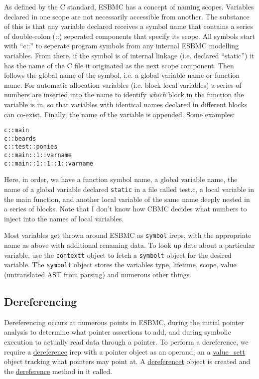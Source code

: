 \documentclass{article}
\begin{document}
As defined by the C standard, ESBMC has a concept of naming scopes. Variables
declared in one scope are not necessarily accessible from another. The substance
of this is that any variable declared receives a symbol name that contains
a series of double-colon (::) seperated components that specify its scope. All
symbols start with ``c::'' to seperate program symbols from any internal
ESBMC modelling variables. From there, if the symbol is of internal linkage
(i.e. declared ``static'') it has the name of the C file it originated as
the next scope component. Then follows the global name of the symbol, i.e.
a global variable name or function name. For automatic allocation variables
(i.e. block local variables) a series of numbers are inserted into the
name to identify \textit{which} block in the function the variable is in, so
that variables with identical names declared in different blocks can co-exist.
Finally, the name of the variable is appended. Some examples:

\begin{lstlisting}
c::main
c::beards
c::test::ponies
c::main::1::varname
c::main::1::1::1::varname
\end{lstlisting}

Here, in order, we have a function symbol name, a global variable name,
the name of a global variable declared \texttt{static} in a file called test.c,
a local variable in the main function, and another local variable of the same
name deeply nested in a series of blocks. Note that I don't know how CBMC
decides what numbers to inject into the names of local variables.

Most variables get thrown around ESBMC as \texttt{symbol} ireps, with the
appropriate name as above with additional renaming data. To look up date about
a particular variable, use the \texttt{contextt} object to fetch a
\texttt{symbolt} object for the desired variable. The \texttt{symbolt} object
stores the variables type, lifetime, scope, value (untranslated AST from
parsing) and numerous other things.

\subsection{Dereferencing}

Dereferencing occurs at numerous points in ESBMC, during the initial pointer
analysis to determine what pointer assertions to add, and during symbolic
execution to actually read data through a pointer. To perform a dereference,
we require a \url{dereference} irep with a pointer object as an operand,
an a \url{value_sett} object tracking what pointers may point at. A
\url{dereferencet} object is created and the \url{dereference} method in it
called.
\end{document}
